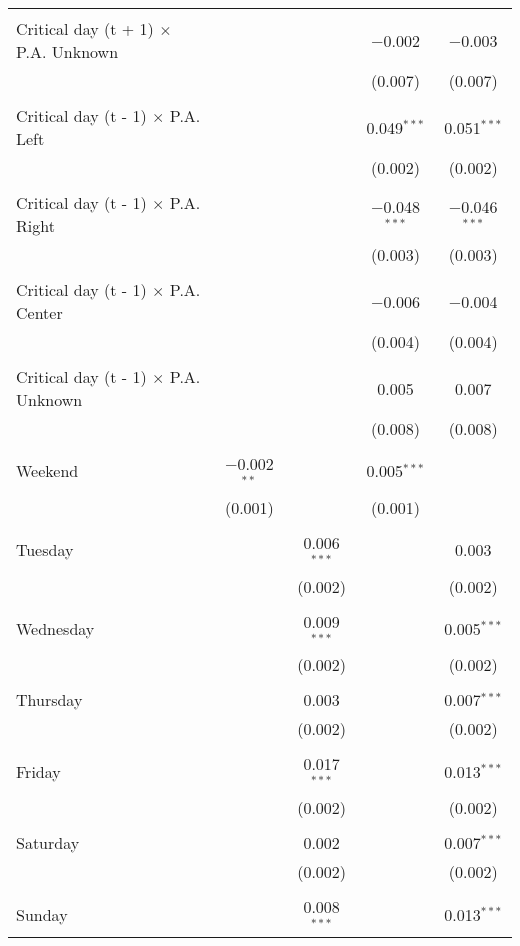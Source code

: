 \documentclass[
]{article}
\begin{document}
\begin{table}[!htbp]
{\begin{tabular}{@{\extracolsep{5pt}}lcccc}
  & & & & \\ 
 Critical day (t + 1) $\times$ P.A. Unknown &  &  & $-$0.002 & $-$0.003 \\ 
  &  &  & (0.007) & (0.007) \\ 
  & & & & \\ 
 Critical day (t - 1) $\times$ P.A. Left &  &  & 0.049$^{***}$ & 0.051$^{***}$ \\ 
  &  &  & (0.002) & (0.002) \\ 
  & & & & \\ 
 Critical day (t - 1) $\times$ P.A. Right &  &  & $-$0.048$^{***}$ & $-$0.046$^{***}$ \\ 
  &  &  & (0.003) & (0.003) \\ 
  & & & & \\ 
 Critical day (t - 1) $\times$ P.A. Center &  &  & $-$0.006 & $-$0.004 \\ 
  &  &  & (0.004) & (0.004) \\ 
  & & & & \\ 
 Critical day (t - 1) $\times$ P.A. Unknown &  &  & 0.005 & 0.007 \\ 
  &  &  & (0.008) & (0.008) \\ 
  & & & & \\ 
 Weekend & $-$0.002$^{**}$ &  & 0.005$^{***}$ &  \\ 
  & (0.001) &  & (0.001) &  \\ 
  & & & & \\ 
 Tuesday &  & 0.006$^{***}$ &  & 0.003 \\ 
  &  & (0.002) &  & (0.002) \\ 
  & & & & \\ 
 Wednesday &  & 0.009$^{***}$ &  & 0.005$^{***}$ \\ 
  &  & (0.002) &  & (0.002) \\ 
  & & & & \\ 
 Thursday &  & 0.003 &  & 0.007$^{***}$ \\ 
  &  & (0.002) &  & (0.002) \\ 
  & & & & \\ 
 Friday &  & 0.017$^{***}$ &  & 0.013$^{***}$ \\ 
  &  & (0.002) &  & (0.002) \\ 
  & & & & \\ 
 Saturday &  & 0.002 &  & 0.007$^{***}$ \\ 
  &  & (0.002) &  & (0.002) \\ 
  & & & & \\ 
 Sunday &  & 0.008$^{***}$ &  & 0.013$^{***}$ \\ 

\end{tabular}}
\end{table}
\end{document}
